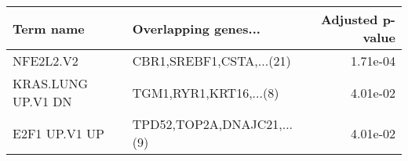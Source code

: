 \begin{tabular}{llr}
\toprule
         Term name &       Overlapping genes... &  Adjusted p-value \\
\midrule
         NFE2L2.V2 &   CBR1,SREBF1,CSTA,...(21) &          1.71e-04 \\
KRAS.LUNG UP.V1 DN &     TGM1,RYR1,KRT16,...(8) &          4.01e-02 \\
     E2F1 UP.V1 UP & TPD52,TOP2A,DNAJC21,...(9) &          4.01e-02 \\
\bottomrule
\end{tabular}
